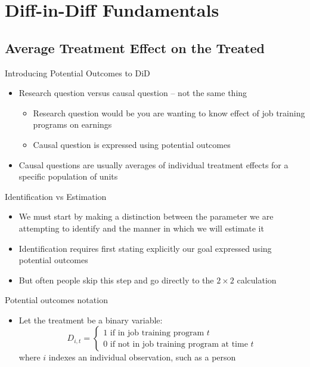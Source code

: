 \documentclass{beamer}
\begin{document}
\section{Diff-in-Diff Fundamentals}

\subsection{Average Treatment Effect on the Treated}

\begin{frame}{Introducing Potential Outcomes to DiD}

\begin{itemize}
\item Research question versus causal question -- not the same thing
	\begin{itemize}
	\item Research question would be you are wanting to know effect of job training programs on earnings
	\item Causal question is expressed using potential outcomes
	\end{itemize}
\item Causal questions are usually averages of individual treatment effects for a specific population of units
\end{itemize}

\end{frame}




\begin{frame}{Identification vs Estimation}

\begin{itemize}
\item We must start by making a distinction between the parameter we are attempting to identify and the manner in which we will estimate it
\item Identification requires first stating explicitly our goal expressed using potential outcomes
\item But often people skip this step and go directly to the  $2 \times 2$ calculation

\end{itemize}

\end{frame}






\begin{frame}{Potential outcomes notation}

	\begin{itemize}
	\item Let the treatment be a binary variable: $$D_{i,t} =\begin{cases} 1 \text{ if in job training program $t$} \\ 0 \text{ if not in job training program at time $t$} \end{cases}$$where $i$ indexes an individual observation, such as a person

	\end{itemize}
\end{frame}
\end{document}

